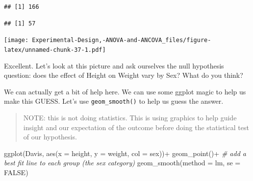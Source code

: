 \documentclass[
]{book}
\newenvironment{Shaded}{\begin{snugshade}}{\end{snugshade}}
\newcommand{\AttributeTok}[1]{\textcolor[rgb]{0.77,0.63,0.00}{#1}}
\newcommand{\CommentTok}[1]{\textcolor[rgb]{0.56,0.35,0.01}{\textit{#1}}}
\newcommand{\ConstantTok}[1]{\textcolor[rgb]{0.00,0.00,0.00}{#1}}
\newcommand{\DecValTok}[1]{\textcolor[rgb]{0.00,0.00,0.81}{#1}}
\newcommand{\FunctionTok}[1]{\textcolor[rgb]{0.00,0.00,0.00}{#1}}
\newcommand{\NormalTok}[1]{#1}
\newcommand{\OtherTok}[1]{\textcolor[rgb]{0.56,0.35,0.01}{#1}}
\newcommand{\SpecialCharTok}[1]{\textcolor[rgb]{0.00,0.00,0.00}{#1}}
\begin{document}
\begin{verbatim}
## [1] 166
\end{verbatim}

\begin{Shaded}
\end{Shaded}

\begin{verbatim}
## [1] 57
\end{verbatim}

\begin{Shaded}
\end{Shaded}

\texttt{[image: Experimental-Design,-ANOVA-and-ANCOVA\_files/figure-latex/unnamed-chunk-37-1.pdf]}

Excellent. Let's look at this picture and ask ourselves the null hypothesis question: does the effect of Height on Weight vary by Sex? What do you think?

We can actually get a bit of help here. We can use some ggplot magic to help us make this GUESS. Let's use \texttt{geom\_smooth()} to help us guess the answer.

\begin{quote}
NOTE: this is not doing statistics. This is using graphics to help guide insight and our expectation of the outcome before doing the statistical test of our hypothesis.
\end{quote}

\begin{Shaded}
\begin{Highlighting}[]
\FunctionTok{ggplot}\NormalTok{(Davis, }\FunctionTok{aes}\NormalTok{(}\AttributeTok{x =}\NormalTok{ height, }\AttributeTok{y =}\NormalTok{ weight, }\AttributeTok{col =}\NormalTok{ sex))}\SpecialCharTok{+}
  \FunctionTok{geom\_point}\NormalTok{()}\SpecialCharTok{+}
  \CommentTok{\# add a best fit line to each group (the sex category)}
  \FunctionTok{geom\_smooth}\NormalTok{(}\AttributeTok{method =}\NormalTok{ lm, }\AttributeTok{se =} \ConstantTok{FALSE}\NormalTok{)}
\end{Highlighting}
\end{Shaded}
\end{document}
